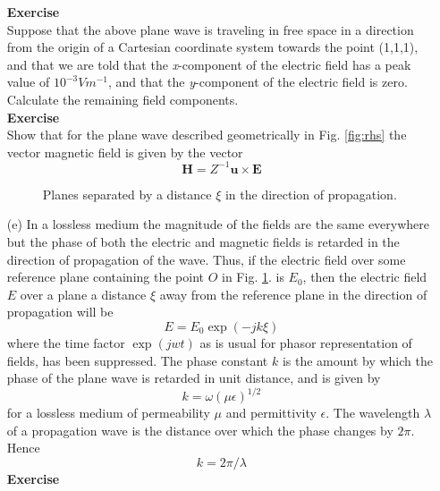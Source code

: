 \begin{itemize}
\noindent \textbf{Exercise}\\
\noindent Suppose that the above plane wave is traveling in free space in a direction from the origin of a Cartesian coordinate system towards the point (1,1,1), and that we are told that the \textit{x}-component of the electric field has a peak value of $10^{-3}Vm^{-1}$, and that the \textit{y}-component of the electric field is zero. Calculate the remaining field components.\\
\noindent \textbf{Exercise}\\
\noindent Show that for the plane wave described geometrically in Fig. \ref{fig:rhs} the vector magnetic field is given by the vector
	\begin{equation}
	\mathbf{H}=Z^{-1}\mathbf{u} \times \mathbf{E}
	\end{equation}
	\begin{figure}[htbp]
		\begin{center}
		\end{center}
		\caption{Planes separated by a distance $\xi$ in the direction of propagation.}
		\label{fig:pwpro}
	\end{figure}
	\item [(e)]
	In a lossless medium the magnitude of the fields are the same everywhere but the phase of both the electric and magnetic fields is retarded in the direction of propagation of the wave. Thus, if the electric field over some reference plane containing the point $O$ in Fig. \ref{fig:pwpro}. is $E_0$, then the electric field $E$ over a plane a distance $\xi$ away from the reference plane in the direction of propagation will be
	\begin{equation}
	E=E_0\exp(-jk\xi)
	\end{equation}
	where the time factor $\exp(jwt)$ as is usual for phasor representation of fields, has been suppressed. The phase constant $k$ is the amount by which the phase of the plane wave is retarded in unit distance, and is given by
	\begin{equation}
	k=\omega(\mu\epsilon)^{1/2}
	\end{equation}
	for a lossless medium of permeability $\mu$ and permittivity $\epsilon$. The wavelength $\lambda$ of a propagation wave is the distance over which the phase changes by $2\pi$. Hence
	\begin{equation}
	k=2\pi/\lambda
	\end{equation}
\noindent \textbf{Exercise}\\

\end{itemize}
